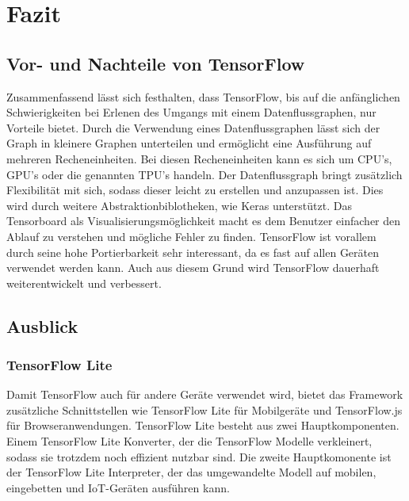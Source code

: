 \chapter{Fazit}
\label{chap:fazit}
\chapterauthor{\authorNiklas}
\section{Vor- und Nachteile von TensorFlow}
\label{sec:vorUndNachteileTensorFlow}
Zusammenfassend lässt sich festhalten, dass TensorFlow, bis auf die anfänglichen Schwierigkeiten bei Erlenen des Umgangs mit einem Datenflussgraphen, nur Vorteile bietet. Durch die Verwendung eines Datenflussgraphen lässt sich der Graph in kleinere Graphen unterteilen und ermöglicht eine Ausführung auf mehreren Recheneinheiten. Bei diesen Recheneinheiten kann es sich um CPU's, GPU's oder die genannten TPU's handeln. Der Datenflussgraph bringt zusätzlich Flexibilität mit sich, sodass dieser leicht zu erstellen und anzupassen ist. Dies wird durch weitere Abstraktionbiblotheken, wie Keras unterstützt. Das Tensorboard als Visualisierungsmöglichkeit macht es dem Benutzer einfacher den Ablauf zu verstehen und mögliche Fehler zu finden. TensorFlow ist vorallem durch seine hohe Portierbarkeit sehr interessant, da es fast auf allen Geräten verwendet werden kann. Auch aus diesem Grund wird TensorFlow dauerhaft weiterentwickelt und verbessert. 

\section{Ausblick}
\label{sec:ausblick}
\subsection{TensorFlow Lite}
\label{sec:tensorFlowLite}
Damit TensorFlow auch für andere Geräte verwendet wird, bietet das Framework zusätzliche Schnittstellen wie TensorFlow Lite für Mobilgeräte und TensorFlow.js für Browseranwendungen. TensorFlow Lite besteht aus zwei Hauptkomponenten. Einem TensorFlow Lite Konverter, der die TensorFlow Modelle verkleinert, sodass sie trotzdem noch effizient nutzbar sind. Die zweite Hauptkomonente ist der TensorFlow Lite Interpreter, der das umgewandelte Modell auf mobilen, eingebetten und IoT-Geräten ausführen kann. 